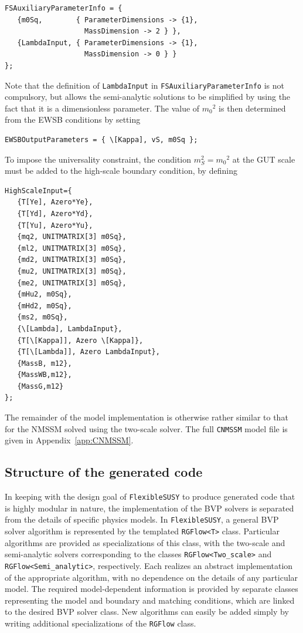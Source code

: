 \documentclass[final,3p,11pt,pdflatex]{elsarticle}
\makeatletter
\newcommand{\modelname}[1]{\texttt{#1}\@\xspace}
\newcommand{\fs}{\texttt{FlexibleSUSY}\@\xspace}
\newcommand{\code}[1]{\lstinline|#1|}  %
\newcommand{\appref}[1]{Appendix~\ref{#1}}
\newcommand{\mzero}{\ensuremath{m_0}\xspace}
\makeatother
\begin{document}
\begin{example}
\begin{lstlisting}
FSAuxiliaryParameterInfo = {
   {m0Sq,        { ParameterDimensions -> {1},
                   MassDimension -> 2 } },
   {LambdaInput, { ParameterDimensions -> {1},
                   MassDimension -> 0 } }
};
\end{lstlisting}
Note that the definition of \code{LambdaInput} in
\code{FSAuxiliaryParameterInfo} is not compulsory, but allows the semi-analytic
solutions to be simplified by using the fact that it is a dimensionless
parameter.  The value of $\mzero^2$ is then determined from the EWSB conditions
by setting
%
\begin{lstlisting}
EWSBOutputParameters = { \[Kappa], vS, m0Sq };
\end{lstlisting}
To impose the universality constraint, the condition $m_S^2 = \mzero^2$ at the
GUT scale must be added to the high-scale boundary condition, by defining
%
\begin{lstlisting}
HighScaleInput={
   {T[Ye], Azero*Ye},
   {T[Yd], Azero*Yd},
   {T[Yu], Azero*Yu},
   {mq2, UNITMATRIX[3] m0Sq},
   {ml2, UNITMATRIX[3] m0Sq},
   {md2, UNITMATRIX[3] m0Sq},
   {mu2, UNITMATRIX[3] m0Sq},
   {me2, UNITMATRIX[3] m0Sq},
   {mHu2, m0Sq},
   {mHd2, m0Sq},
   {ms2, m0Sq},
   {\[Lambda], LambdaInput},
   {T[\[Kappa]], Azero \[Kappa]},
   {T[\[Lambda]], Azero LambdaInput},
   {MassB, m12},
   {MassWB,m12},
   {MassG,m12}
};
\end{lstlisting}
The remainder of the model implementation is otherwise rather similar to that
for the NMSSM solved using the two-scale solver.  The full \modelname{CNMSSM}
model file is given in \appref{app:CNMSSM}.
\end{example}

\subsection{Structure of the generated code}

In keeping with the design goal of \fs to produce generated code that is highly
modular in nature, the implementation of the BVP solvers is separated from
the details of specific physics models.  In \fs, a general BVP solver algorithm
is represented by the templated \code{RGFlow<T>} class.  Particular algorithms
are provided as specializations of this class, with the two-scale and
semi-analytic solvers corresponding to the classes \code{RGFlow<Two_scale>}
and \code{RGFlow<Semi_analytic>}, respectively.  Each realizes an abstract
implementation of the appropriate algorithm, with no dependence on the details
of any particular model.  The required model-dependent information is provided
by separate classes representing the model and boundary and matching conditions,
which are linked to the desired BVP solver class.  New algorithms can easily be
added simply by writing additional specializations of the \code{RGFlow} class.
\end{document}
